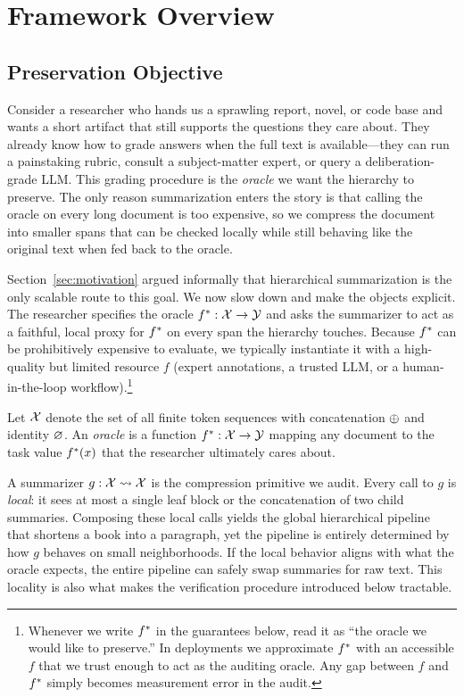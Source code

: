 \section{Framework Overview}\label{sec:overview}

\subsection{Preservation Objective}

Consider a researcher who hands us a sprawling report, novel, or code base and wants a short artifact that still supports the questions they care about. They already know how to grade answers when the full text is available---they can run a painstaking rubric, consult a subject-matter expert, or query a deliberation-grade LLM. This grading procedure is the \emph{oracle} we want the hierarchy to preserve. The only reason summarization enters the story is that calling the oracle on every long document is too expensive, so we compress the document into smaller spans that can be checked locally while still behaving like the original text when fed back to the oracle.

Section~\ref{sec:motivation} argued informally that hierarchical summarization is the only scalable route to this goal. We now slow down and make the objects explicit. The researcher specifies the oracle $f^{\ast}: \mathcal{X} \to \mathcal{Y}$ and asks the summarizer to act as a faithful, local proxy for $f^{\ast}$ on every span the hierarchy touches. Because $f^{\ast}$ can be prohibitively expensive to evaluate, we typically instantiate it with a high-quality but limited resource $f$ (expert annotations, a trusted LLM, or a human-in-the-loop workflow).\footnote{Whenever we write $f^{\ast}$ in the guarantees below, read it as ``the oracle we would like to preserve.'' In deployments we approximate $f^{\ast}$ with an accessible $f$ that we trust enough to act as the auditing oracle. Any gap between $f$ and $f^{\ast}$ simply becomes measurement error in the audit.}

\begin{definition}[Oracle]\label{def:oracle}
Let $\mathcal{X}$ denote the set of all finite token sequences with concatenation $\oplus$ and identity $\varnothing$. An \emph{oracle} is a function $f^{\ast}: \mathcal{X} \to \mathcal{Y}$ mapping any document to the task value $f^{\ast}(x)$ that the researcher ultimately cares about.
\end{definition}

A summarizer $g: \mathcal{X} \rightsquigarrow \mathcal{X}$ is the compression primitive we audit. Every call to $g$ is \emph{local}: it sees at most a single leaf block or the concatenation of two child summaries. Composing these local calls yields the global hierarchical pipeline that shortens a book into a paragraph, yet the pipeline is entirely determined by how $g$ behaves on small neighborhoods. If the local behavior aligns with what the oracle expects, the entire pipeline can safely swap summaries for raw text. This locality is also what makes the verification procedure introduced below tractable.

